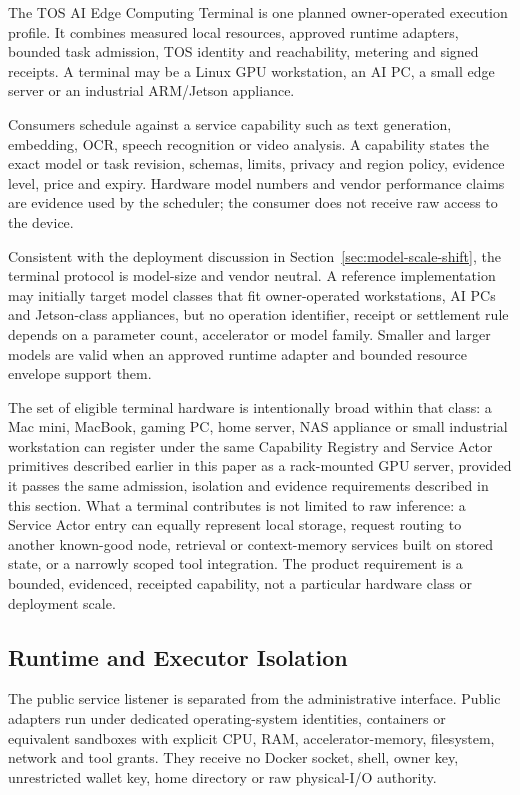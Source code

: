 \documentclass[11pt,oneside]{article}
\begin{document}
The TOS AI Edge Computing Terminal is one planned owner-operated execution profile. It
combines measured local resources, approved runtime adapters, bounded task admission, TOS
identity and reachability, metering and signed receipts. A terminal may be a Linux GPU
workstation, an AI PC, a small edge server or an industrial ARM/Jetson appliance.

Consumers schedule against a service capability such as text generation, embedding, OCR,
speech recognition or video analysis. A capability states the exact model or task revision,
schemas, limits, privacy and region policy, evidence level, price and expiry. Hardware model
numbers and vendor performance claims are evidence used by the scheduler; the consumer does
not receive raw access to the device.

Consistent with the deployment discussion in Section~\ref{sec:model-scale-shift}, the
terminal protocol is model-size and vendor neutral. A reference implementation may initially
target model classes that fit owner-operated workstations, AI PCs and Jetson-class appliances,
but no operation identifier, receipt or settlement rule depends on a parameter count,
accelerator or model family. Smaller and larger models are valid when an approved runtime
adapter and bounded resource envelope support them.

The set of eligible terminal hardware is intentionally broad within that class: a Mac
mini, MacBook, gaming PC, home server, NAS appliance or small industrial workstation can
register under the same Capability Registry and Service Actor primitives described earlier
in this paper as a rack-mounted GPU server, provided it passes the same admission,
isolation and evidence requirements described in this section. What a terminal contributes
is not limited to raw inference: a Service Actor entry can equally represent local storage,
request routing to another known-good node, retrieval or context-memory services built on
stored state, or a narrowly scoped tool integration. The product requirement is a bounded,
evidenced, receipted capability, not a particular hardware class or deployment scale.

\subsection{Runtime and Executor Isolation}

The public service listener is separated from the administrative interface. Public adapters
run under dedicated operating-system identities, containers or equivalent sandboxes with
explicit CPU, RAM, accelerator-memory, filesystem, network and tool grants. They receive no
Docker socket, shell, owner key, unrestricted wallet key, home directory or raw physical-I/O
authority.
\end{document}
